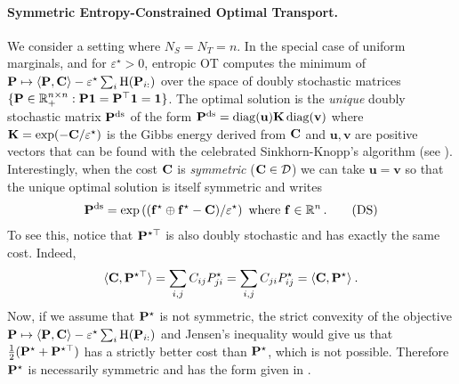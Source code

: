\paragraph{Symmetric Entropy-Constrained Optimal Transport.} 
We consider a setting where $N_S = N_T = n$. In the special case of uniform
marginals, and for $\varepsilon^\star > 0$, entropic OT computes the minimum of $\mathbf{P}
\mapsto \langle \mathbf{P}, \mathbf{C} \rangle -\varepsilon^\star \sum_{i} \operatorname{H}(\mathbf{P}_{i:})$
over the space of doubly stochastic matrices $\{\mathbf{P} \in \mathbb{R}_{+}^{n \times n} :
\mathbf{P} \bm{1} = \mathbf{P}^\top \bm{1} =\bm{1}\}$. The optimal solution is the
\emph{unique} doubly stochastic matrix $\mathbf{P}^{\mathrm{ds}}$ of the form $\mathbf{P}^{\mathrm{ds}}=\operatorname{diag}(\mathbf{u})\mathbf{K}
\operatorname{diag}(\mathbf{v})$ where $\mathbf{K} = \exp(-\mathbf{C}/\varepsilon^\star)$ is the Gibbs energy derived from
$\mathbf{C}$ and $\mathbf{u}, \mathbf{v}$ are positive vectors that can be found with
the celebrated Sinkhorn-Knopp’s algorithm \citep{cuturi2013sinkhorn,
sinkhorn1964relationship} (see ). Interestingly, when the cost $\mathbf{C}$ is \emph{symmetric}
(\eg $\mathbf{C} \in \mathcal{D}$) we can take $\mathbf{u} = \mathbf{v}$ \cite[Section
5.2]{idel2016review} so that the unique optimal solution is itself symmetric and writes  
\begin{align}\label{eq:plan_sym_sinkhorn}
    \mathbf{P}^{\mathrm{ds}} = \exp \left((\mathbf{f}^\star \oplus \mathbf{f}^\star - \mathbf{C}) / \varepsilon^\star \right) \text{ where } \mathbf{f} \in \mathbb{R}^n \,.
\tag{DS}
\end{align}
To see this, notice that ${\mathbf{P}}^{\star \top}$ is also doubly stochastic and has exactly the same cost. Indeed,
\begin{align}
    \langle {\mathbf{C}}, {\mathbf{P}}^{\star \top} \rangle = \sum_{i,j} C_{ij} P^{\star}_{ji} = \sum_{i,j} C_{ji} P^{\star}_{ij} = \langle {\mathbf{C}}, {\mathbf{P}}^{\star} \rangle \:.
\end{align}
Now, if we assume that ${\mathbf{P}}^\star$ is not symmetric, the strict convexity of the objective $\mathbf{P}
\mapsto \langle \mathbf{P}, \mathbf{C} \rangle -\varepsilon^\star \sum_{i} \operatorname{H}(\mathbf{P}_{i:})$ and Jensen's inequality would give us that $\frac{1}{2} ({\mathbf{P}}^\star + {\mathbf{P}}^{\star \top})$ has a strictly better cost than ${\mathbf{P}}^{\star}$, which is not possible. Therefore ${\mathbf{P}}^\star$ is necessarily symmetric and has the form given in .

